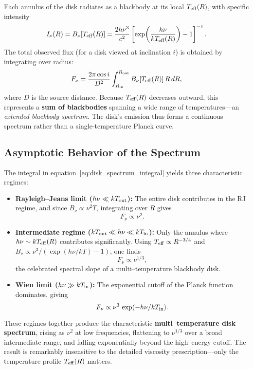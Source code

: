 Each annulus of the disk radiates as a blackbody at its local $T_{\rm eff}(R)$, with specific intensity
\[
I_\nu(R) = B_\nu[T_{\rm eff}(R)]
= \frac{2h\nu^3}{c^2}\left[\exp\!\left(\frac{h\nu}{kT_{\rm eff}(R)}\right)-1\right]^{-1}.
\]
The total observed flux (for a disk viewed at inclination $i$) is obtained by integrating over radius:
\begin{equation}
F_\nu = \frac{2\pi\cos i}{D^2}
\int_{R_{\rm in}}^{R_{\rm out}} B_\nu[T_{\rm eff}(R)]\,R\,dR,
\label{eq:disk_spectrum_integral}
\end{equation}
where $D$ is the source distance. Because $T_{\rm eff}(R)$ decreases outward, this represents a \textbf{sum of blackbodies} spanning a wide range of temperatures—an \emph{extended blackbody spectrum}. The disk’s emission thus forms a continuous spectrum rather than a single-temperature Planck curve.

\subsection*{Asymptotic Behavior of the Spectrum}

The integral in equation~\eqref{eq:disk_spectrum_integral} yields three characteristic regimes:

\begin{itemize}
\item \textbf{Rayleigh–Jeans limit ($h\nu \ll kT_{\rm out}$):}  
   The entire disk contributes in the RJ regime, and since $B_\nu \propto \nu^2 T$,  
   integrating over $R$ gives
   \[
   F_\nu \propto \nu^2.
   \]

\item \textbf{Intermediate regime ($kT_{\rm out} \ll h\nu \ll kT_{\rm in}$):}  
   Only the annulus where $h\nu \sim kT_{\rm eff}(R)$ contributes significantly.  
   Using $T_{\rm eff}\propto R^{-3/4}$ and $B_\nu \propto \nu^3/(\exp(h\nu/kT)-1)$, one finds
   \[
   \boxed{F_\nu \propto \nu^{1/3},}
   \]
   the celebrated spectral slope of a multi–temperature blackbody disk.

\item \textbf{Wien limit ($h\nu \gg kT_{\rm in}$):}  
   The exponential cutoff of the Planck function dominates, giving  
   \[
   F_\nu \propto \nu^3\,\exp(-h\nu/kT_{\rm in}).
   \]
\end{itemize}

\medskip
\noindent
These regimes together produce the characteristic \textbf{multi–temperature disk spectrum}, rising as $\nu^2$ at low frequencies, flattening to $\nu^{1/3}$ over a broad intermediate range, and falling exponentially beyond the high–energy cutoff.  
The result is remarkably insensitive to the detailed viscosity prescription—only the temperature profile $T_{\rm eff}(R)$ matters.
